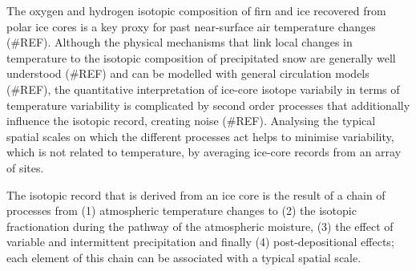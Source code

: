 \documentclass[cp, manuscript]{copernicus}
\begin{document}
\introduction

The oxygen and hydrogen isotopic composition of firn and ice recovered from
polar ice cores is a key proxy for past near-surface air temperature changes
(\#REF). Although the physical mechanisms that link local changes in temperature
to the isotopic composition of precipitated snow are generally well understood
(\#REF) and can be modelled with general circulation models (\#REF), the
quantitative interpretation of ice-core isotope variabily in terms of
temperature variability is complicated by second order processes that
additionally influence the isotopic record, creating noise (\#REF). Analysing
the typical spatial scales on which the different processes act helps to
minimise variability, which is not related to temperature, by averaging ice-core
records from an array of sites.

The isotopic record that is derived from an ice core is the result of a chain of
processes from (1) atmospheric temperature changes to (2) the isotopic
fractionation during the pathway of the atmospheric moisture, (3) the effect of
variable and intermittent precipitation and finally (4) post-depositional
effects; each element of this chain can be associated with a typical spatial
scale.
\end{document}
